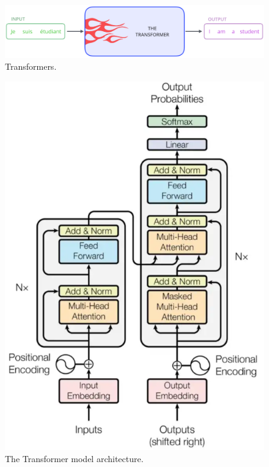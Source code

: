 \begin{figure}
    \centering
    \includegraphics[width=\textwidth]{images/transormers.png}
    \caption{Transformers.}
    \label{fig:transformers}
\end{figure}

\begin{figure}
    \centering
    \includegraphics[width=\textwidth]{images/transformerMedium.png}
    \caption{The Transformer model architecture.}
    \label{fig:transformerMedium}
\end{figure}

